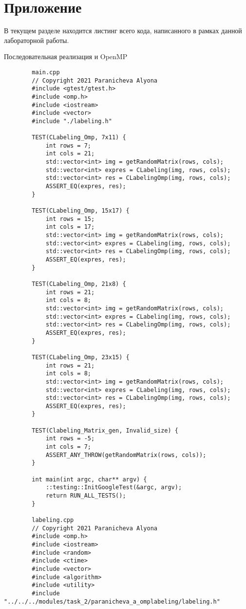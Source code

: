 \documentclass{report}
\begin{document}
	\section*{Приложение}
	\par В текущем разделе находится листинг всего кода, написанного в рамках данной лабораторной работы.
	\par Последовательная реализация и OpenMP
	\begin{lstlisting}
		main.cpp
	    // Copyright 2021 Paranicheva Alyona
	    #include <gtest/gtest.h>
	    #include <omp.h>
	    #include <iostream>
	    #include <vector>
	    #include "./labeling.h"
	    
	    TEST(CLabeling_Omp, 7x11) {
	    	int rows = 7;
	    	int cols = 21;
	    	std::vector<int> img = getRandomMatrix(rows, cols);
	    	std::vector<int> expres = CLabeling(img, rows, cols);
	    	std::vector<int> res = CLabelingOmp(img, rows, cols);
	    	ASSERT_EQ(expres, res);
	    }
	    
	    TEST(CLabeling_Omp, 15x17) {
	    	int rows = 15;
	    	int cols = 17;
	    	std::vector<int> img = getRandomMatrix(rows, cols);
	    	std::vector<int> expres = CLabeling(img, rows, cols);
	    	std::vector<int> res = CLabelingOmp(img, rows, cols);
	    	ASSERT_EQ(expres, res);
	    }
	    
	    TEST(CLabeling_Omp, 21x8) {
	    	int rows = 21;
	    	int cols = 8;
	    	std::vector<int> img = getRandomMatrix(rows, cols);
	    	std::vector<int> expres = CLabeling(img, rows, cols);
	    	std::vector<int> res = CLabelingOmp(img, rows, cols);
	    	ASSERT_EQ(expres, res);
	    }
	    
	    TEST(CLabeling_Omp, 23x15) {
	    	int rows = 21;
	    	int cols = 8;
	    	std::vector<int> img = getRandomMatrix(rows, cols);
	    	std::vector<int> expres = CLabeling(img, rows, cols);
	    	std::vector<int> res = CLabelingOmp(img, rows, cols);
	    	ASSERT_EQ(expres, res);
	    }
	    
	    TEST(Clabeling_Matrix_gen, Invalid_size) {
	    	int rows = -5;
	    	int cols = 7;
	    	ASSERT_ANY_THROW(getRandomMatrix(rows, cols));
	    }
	    
	    int main(int argc, char** argv) {
	    	::testing::InitGoogleTest(&argc, argv);
	    	return RUN_ALL_TESTS();
	    }
    
	    labeling.cpp
	    // Copyright 2021 Paranicheva Alyona
	    #include <omp.h>
	    #include <iostream>
	    #include <random>
	    #include <ctime>
	    #include <vector>
	    #include <algorithm>
	    #include <utility>
	    #include "../../../modules/task_2/paranicheva_a_omplabeling/labeling.h"
	    

\end{lstlisting}
\end{document}
